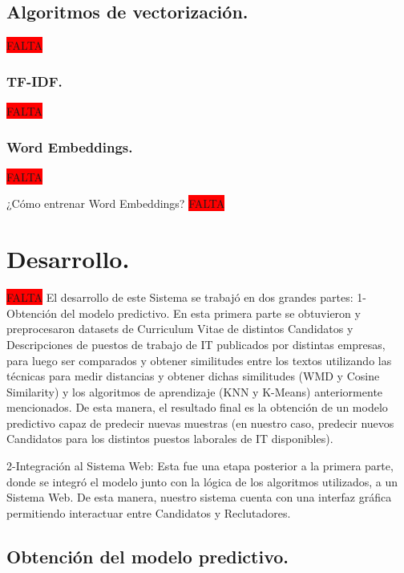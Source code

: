 \documentclass[12pt,a4paper]{article}
\makeatletter
\renewcommand\paragraph{\@startsection{paragraph}{4}{\z@}
            {-2.5ex\@plus -1ex \@minus -.25ex}
            {1.25ex \@plus .25ex}
            {\normalfont\normalsize\bfseries}}
\makeatother
\begin{document}
\subsection{Algoritmos de vectorización.}
\colorbox{red}{FALTA}

\subsubsection{TF-IDF.}
\colorbox{red}{FALTA}

\subsubsection{Word Embeddings.}
\colorbox{red}{FALTA}

\paragraph{¿Cómo entrenar Word Embeddings?}
\colorbox{red}{FALTA}

\section{Desarrollo.}
\colorbox{red}{FALTA}
El desarrollo de este Sistema se trabajó en dos grandes partes:
	1-Obtención del modelo predictivo. En esta primera parte se obtuvieron y preprocesaron datasets de Curriculum Vitae de distintos Candidatos y Descripciones de puestos de trabajo de IT publicados por distintas empresas, para luego ser comparados y obtener similitudes entre los textos utilizando las técnicas para medir distancias y obtener dichas similitudes (WMD y Cosine Similarity) y los algoritmos de aprendizaje (KNN y K-Means) anteriormente mencionados. De esta manera, el resultado final es la obtención de un modelo predictivo capaz de predecir nuevas muestras (en nuestro caso, predecir nuevos Candidatos para los distintos puestos laborales de IT disponibles).
		
	2-Integración al Sistema Web: Esta fue una etapa posterior a la primera parte, donde se integró el modelo junto con la lógica de los algoritmos utilizados, a un Sistema Web. De esta manera, nuestro sistema cuenta con una interfaz gráfica permitiendo interactuar entre Candidatos y Reclutadores. 
	
\subsection{Obtención del modelo predictivo.}
\end{document}
